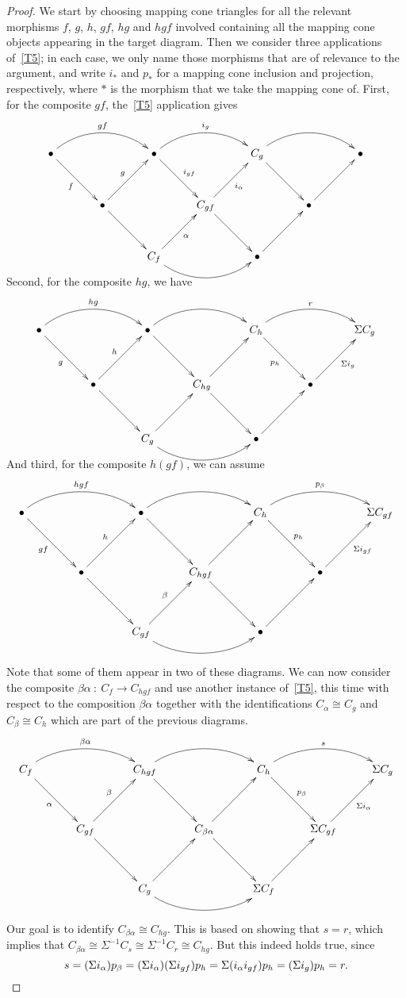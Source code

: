 \documentclass{amsproc}
\theoremstyle{definition}
\begin{document}
\begin{proof}
We start by choosing mapping cone triangles for all the relevant morphisms $f$, $g$, $h$, $gf$, $hg$ and $hgf$ involved containing all the mapping cone objects appearing in the target diagram. Then we consider three applications of~\ref{T5}; in each case, we only name those morphisms that are of relevance to the argument, and write $i_\ast$ and $p_\ast$ for a mapping cone inclusion and projection, respectively, where $\ast$ is the morphism that we take the mapping cone of. First, for the composite $gf$, the~\ref{T5} application gives
\[
\xymatrix@!{ {\bullet}\ar@(ru,lu)[rr]^{gf}\ar[rd]_f && {\bullet}\ar@(ru,lu)[rr]^{i_g} \ar[rd]^{i_{gf}} && C_g \ar@(ru,lu)[rr]\ar[rd] && {\bullet}\\
& {\bullet}\ar[ru]^g \ar[rd] && C_{gf} \ar[ru]_{i_\alpha} \ar[rd] && {\bullet}\ar[ru] \\
&& C_f \ar[ru]_\alpha \ar@(rd,ld)[rr] && \bullet \ar[ru] \\ }
\]
Second, for the composite $hg$, we have
\[
\xymatrix@!{ {\bullet}\ar@(ru,lu)[rr]^{hg}\ar[rd]_g && {\bullet}\ar@(ru,lu)[rr] \ar[rd] && C_h \ar@(ru,lu)[rr]^r \ar[rd]_{p_h} && \Sigma C_g \\
& {\bullet}\ar[ru]^h \ar[rd] && C_{hg} \ar[ru] \ar[rd] && {\bullet}\ar[ru]_{\Sigma i_g} \\
&& C_g \ar[ru] \ar@(rd,ld)[rr] && \bullet \ar[ru] \\}
\]
And third, for the composite $h(gf)$, we can assume
\[
\xymatrix@!{ {\bullet}\ar@(ru,lu)[rr]^{hgf}\ar[rd]_{gf} && {\bullet}\ar@(ru,lu)[rr] \ar[rd] && C_h \ar@(ru,lu)[rr]^{p_\beta} \ar[rd]^{p_h} && \Sigma C_{gf} \\
& {\bullet}\ar[ru]^h \ar[rd] && C_{hgf} \ar[ru] \ar[rd] && {\bullet}\ar[ru]_{\Sigma i_{gf}} \\
&& C_{gf} \ar[ru]^\beta \ar@(rd,ld)[rr] && \bullet \ar[ru] }
\]\\

\noindent Note that some of them appear in two of these diagrams. We can now consider the composite $\beta\alpha\: :\: C_f\to C_{hgf}$ and use another instance of~\ref{T5}, this time with respect to the composition $\beta\alpha$ together with the identifications $C_\alpha \cong C_g$ and $C_\beta \cong C_h$ which are part of the previous diagrams.
\[
\xymatrix@!{ C_f \ar@(ru,lu)[rr]^{\beta\alpha} \ar[rd]_{\alpha} && C_{hgf} \ar@(ru,lu)[rr] \ar[rd] && C_h \ar@(ru,lu)[rr]^s \ar[rd]^{p_\beta} && \Sigma C_g \\
& C_{gf} \ar[ru]^\beta \ar[rd] && C_{\beta\alpha} \ar[ru] \ar[rd] && \Sigma C_{gf} \ar[ru]_{\Sigma i_\alpha} \\
&& C_{g} \ar[ru] \ar@(rd,ld)[rr] && \Sigma C_f \ar[ru] }
\]
\\

\noindent Our goal is to identify $C_{\beta\alpha}\cong C_{hg}$. This is based on showing that $s=r$, which implies that $C_{\beta\alpha} \cong \Sigma^{-1} C_s \cong \Sigma^{-1} C_r \cong C_{hg}$. But this indeed holds true, since 
\[
s = (\Sigma i_\alpha) p_\beta = (\Sigma i_\alpha) (\Sigma i_{gf}) p_h = \Sigma(i_\alpha i_{gf}) p_h = (\Sigma i_g) p_h = r. \qedhere
\]
\end{proof}
\end{document}

